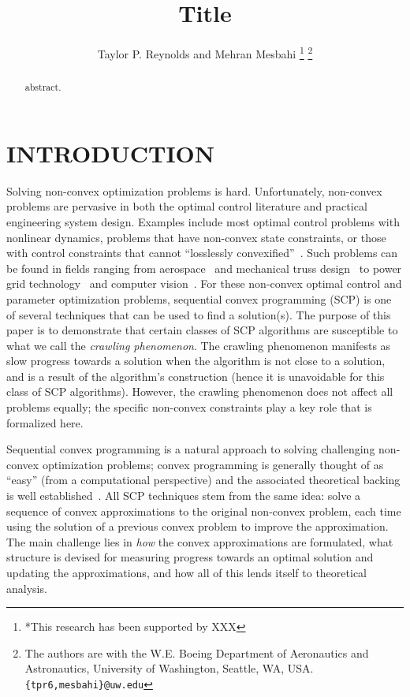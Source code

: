 \documentclass[letterpaper, 10 pt, conference]{ieeeconf}
\title{\LARGE \bf Title
}
\author{Taylor P. Reynolds and Mehran Mesbahi%
\thanks{*This research has been supported by XXX}%
\thanks{The authors are with the W.E. Boeing Department of Aeronautics and Astronautics,
        University of Washington, Seattle, WA, USA.
        {\tt\small \{tpr6,mesbahi\}@uw.edu}}%
}
\begin{document}
\maketitle
\thispagestyle{empty}
\pagestyle{empty}


\begin{abstract}

abstract.

\end{abstract}


\section{INTRODUCTION}\label{sec:intro}

Solving non-convex optimization problems is hard. Unfortunately, non-convex problems are pervasive in both the optimal control literature and practical engineering system design. Examples include most optimal control problems with nonlinear dynamics, problems that have non-convex state constraints, or those with control constraints that cannot ``losslessly convexified''~\cite{Acikmese2011,Blackmore2012b}. Such problems can be found in fields ranging from aerospace~\cite{SzmukReynolds2018,Lee2017,Liu2014} and mechanical truss design~\cite{Beck2010} to power grid technology~\cite{Wei2017} and computer vision~\cite{Jiang2007}. For these non-convex optimal control and parameter optimization problems, sequential convex programming (SCP) is one of several techniques that can be used to find a solution(s). The purpose of this paper is to demonstrate that certain classes of SCP algorithms are susceptible to what we call the \textit{crawling phenomenon}. The crawling phenomenon manifests as slow progress towards a solution when the algorithm is not close to a solution, and is a result of the algorithm's construction (hence it is unavoidable for this class of SCP algorithms). However, the crawling phenomenon does not affect all problems equally; the specific non-convex constraints play a key role that is formalized here. 

Sequential convex programming is a natural approach to solving challenging non-convex optimization problems; convex programming is generally thought of as ``easy'' (from a computational perspective) and the associated theoretical backing is well established~\cite{Rockafellar1970,BoydBook}. All SCP techniques stem from the same idea: solve a sequence of convex approximations to the original non-convex problem, each time using the solution of a previous convex problem to improve the approximation.  The main challenge lies in \textit{how} the convex approximations are formulated, what structure is devised for measuring progress towards an optimal solution and updating the approximations, and how all of this lends itself to theoretical analysis. 
\end{document}
